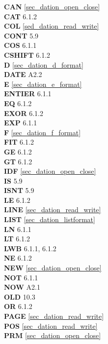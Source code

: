 {{{\bf CAN} \ref{sec_dation_open_close}\\
{\bf CAT} 6.1.2\\
{\bf COL} \ref{sed_dation_read_write}\\
{\bf CONT} 5.9\\
{\bf COS} 6.1.1\\
{\bf CSHIFT} 6.1.2\\
 
{\bf D} \ref{sec_dation_d_format}\\
{\bf DATE} A2.2\\
 
{\bf E} \ref{sec_dation_e_format}\\
{\bf ENTIER} 6.1.1\\
{\bf EQ} 6.1.2\\
{\bf EXOR} 6.1.2\\
{\bf EXP} 6.1.1\\
 
{\bf F} \ref{sec_dation_f_format}\\
{\bf FIT} 6.1.2\\
 
{\bf GE} 6.1.2\\
{\bf GT} 6.1.2\\
 
{\bf IDF} \ref{sec_dation_open_close}\\
{\bf IS} 5.9\\
{\bf ISNT} 5.9\\

 
{\bf LE} 6.1.2\\
{\bf LINE} \ref{sec_dation_read_write}\\
{\bf LIST} \ref{sec_dation_listformat}\\
{\bf LN} 6.1.1\\
{\bf LT} 6.1.2\\
{\bf LWB} 6.1.1, 6.1.2\\
 
{\bf NE} 6.1.2\\
{\bf NEW} \ref{sec_dation_open_close}\\
{\bf NOT} 6.1.1\\
{\bf NOW} A2.1\\
 
{\bf OLD} 10.3\\
{\bf OR} 6.1.2\\
 
{\bf PAGE} \ref{sec_dation_read_write}\\
{\bf POS} \ref{sec_dation_read_write}\\
{\bf PRM} \ref{sec_dation_open_close}\\
 
}}
